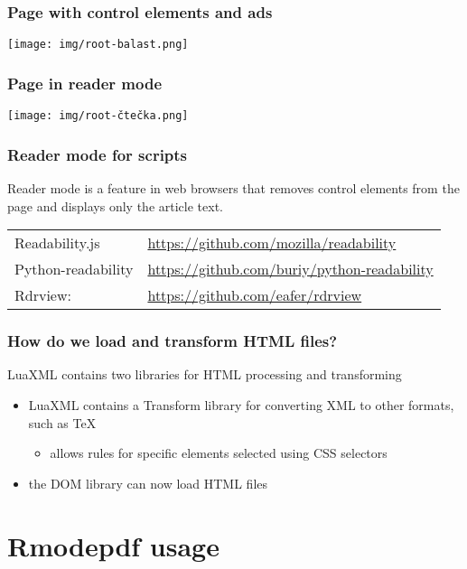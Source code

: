 \begin{frame}
  \frametitle{Page with control elements and ads}
  \begin{center}
    \texttt{[image: img/root-balast.png]}
  \end{center}
\end{frame}

\begin{frame}
  \frametitle{Page in reader mode}
  \begin{center}
    \texttt{[image: img/root-čtečka.png]}
  \end{center}
\end{frame}

\begin{frame}
  \frametitle{Reader mode for scripts}
  Reader mode is a feature in web browsers that removes control elements from the page and displays only the article text.

  \bigskip

  \begin{tabular}{ll}
    Readability.js & \url{https://github.com/mozilla/readability}\\
    Python-readability & \url{https://github.com/buriy/python-readability}\\
    Rdrview: & \url{https://github.com/eafer/rdrview}\\
  \end{tabular}

\end{frame}


\begin{frame}
  \frametitle{How do we load and transform HTML files?}
  LuaXML contains two libraries for HTML processing and transforming
  \begin{itemize}
    \item LuaXML contains a Transform library for converting XML to other formats, such as \TeX
      \begin{itemize}
        \item allows rules for specific elements selected using CSS selectors
      \end{itemize}
    \item the DOM library can now load HTML files
  \end{itemize}
\end{frame}

\section{Rmodepdf usage}

